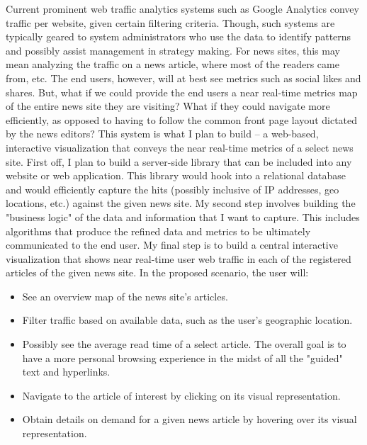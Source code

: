 \documentclass[12pt]{article}
\begin{document}
Current prominent web traffic analytics systems such as Google Analytics convey traffic per website, given certain filtering criteria. Though, such systems are typically geared to system administrators who use the data to identify patterns and possibly assist management in strategy making. For news sites, this may mean analyzing the traffic on a news article, where most of the readers came from, etc. The end users, however, will at best see metrics such as social likes and shares. But, what if we could provide the end users a near real-time metrics map of the entire news site they are visiting? What if they could navigate more efficiently, as opposed to having to follow the common front page layout dictated by the news editors? This system is what I plan to build – a web-based, interactive visualization that conveys the near real-time metrics of a select news site.
First off, I plan to build a server-side library that can be included into any website or web application. This library would hook into a relational database and would efficiently capture the hits (possibly inclusive of IP addresses, geo locations, etc.) against the given news site.
My second step involves building the "business logic" of the data and information that I want to capture. This includes algorithms that produce the refined data and metrics to be ultimately communicated to the end user.
My final step is to build a central interactive visualization that shows near real-time user web traffic in each of the registered articles of the given news site. In the proposed scenario, the user will:
\begin{itemize}
\item See an overview map of the news site’s articles.
\item Filter traffic based on available data, such as the user’s geographic location.
\item Possibly see the average read time of a select article. The overall goal is to have a more personal browsing experience in the midst of all the "guided" text and hyperlinks.
\item Navigate to the article of interest by clicking on its visual representation.
\item Obtain details on demand for a given news article by hovering over its visual representation.
\end{itemize}
\end{document}
